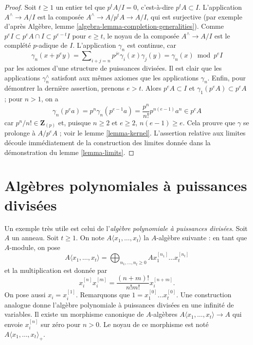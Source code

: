 \begin{proof}

Soit $t \geq 1$ un entier tel que $p^tA/I = 0$, c'est-à-dire $p^tA \subset I$. L'application $A^\wedge \to A/I$ est la composée $A^\wedge \to A/p^tA \to A/I$,
qui est surjective (par exemple d'après Algèbre, lemme \ref{algebra-lemma-completion-generalities}). Comme $p^eI \subset p^eA \cap I \subset p^{e - t}I$ pour $e \geq t$, le noyau de la composée $A^\wedge \to A/I$ est le complété $p$-adique de $I$. L'application $\gamma_n$ est continue, car
$$
\gamma_n(x + p^ey) =
\sum\nolimits_{i + j = n} p^{je}\gamma_i(x)\gamma_j(y) =
\gamma_n(x) \bmod p^eI
$$
par les axiomes d'une structure de puissances divisées. Il est clair que les applications $\gamma_n^\wedge$ satisfont aux mêmes axiomes que les applications $\gamma_n$.
Enfin, pour démontrer la dernière assertion, prenons $e > t$. Alors $p^eA \subset I$ et $\gamma_1(p^eA) \subset p^eA$ ; pour $n > 1$, on a
$$
\gamma_n(p^ea) = p^n \gamma_n(p^{e - 1}a) = \frac{p^n}{n!} p^{n(e - 1)}a^n
\in p^e A
$$
car $p^n/n! \in \mathbf{Z}_{(p)}$ et, puisque $n \geq 2$ et $e \geq 2$,
$n(e - 1) \geq e$. Cela prouve que $\gamma$ se prolonge à $A/p^eA$ ; voir le lemme \ref{lemma-kernel}. L'assertion relative aux limites découle immédiatement de la construction des limites donnée dans la démonstration du lemme \ref{lemma-limits}.

\end{proof}
\section{Algèbres polynomiales à puissances divisées}
\label{section-divided-power-polynomial-ring}

\noindent
Un exemple très utile est celui de l'{\it algèbre polynomiale à puissances
divisées}. Soit $A$ un anneau. Soit $t \geq 1$. On note
$A\langle x_1, \ldots, x_t \rangle$ la $A$-algèbre suivante :
en tant que $A$-module, on pose
$$
A\langle x_1, \ldots, x_t \rangle =
\bigoplus\nolimits_{n_1, \ldots, n_t \geq 0} A x_1^{[n_1]} \ldots x_t^{[n_t]}
$$
et la multiplication est donnée par
$$
x_i^{[n]}x_i^{[m]} = \frac{(n + m)!}{n!m!}x_i^{[n + m]}.
$$
On pose aussi $x_i = x_i^{[1]}$. Remarquons que
$1 = x_1^{[0]} \ldots x_t^{[0]}$. Une construction analogue donne
l'algèbre polynomiale à puissances divisées en une infinité de variables.
Il existe un morphisme canonique de $A$-algèbres
$A\langle x_1, \ldots, x_t \rangle \to A$ qui envoie $x_i^{[n]}$ sur zéro
pour $n > 0$. Le noyau de ce morphisme est noté
$A\langle x_1, \ldots, x_t \rangle_{+}$.

